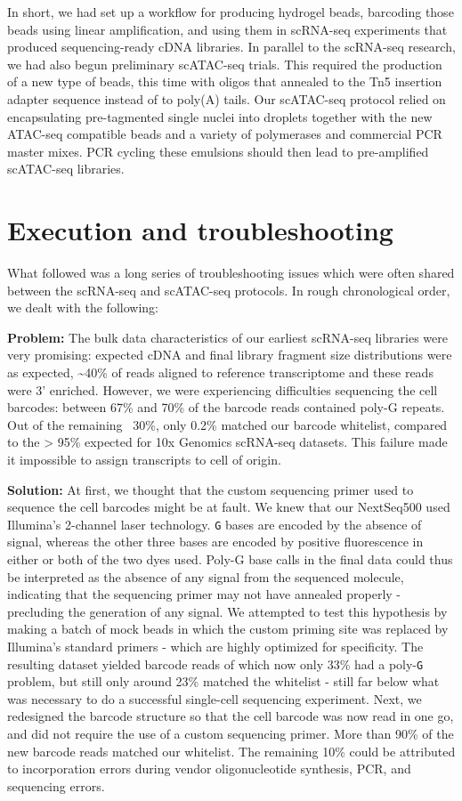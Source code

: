In short, we had set up a workflow for producing hydrogel beads, barcoding those beads using linear amplification, and using them in scRNA-seq experiments that produced sequencing-ready cDNA libraries. In parallel to the scRNA-seq research, we had also begun preliminary scATAC-seq trials. This required the production of a new type of beads, this time with oligos that annealed to the Tn5 insertion adapter sequence instead of to poly(A) tails. Our scATAC-seq protocol relied on encapsulating pre-tagmented single nuclei into droplets together with the new ATAC-seq compatible beads and a variety of polymerases and commercial PCR master mixes. PCR cycling these emulsions should then lead to pre-amplified scATAC-seq libraries.

\section{Execution and troubleshooting}
What followed was a long series of troubleshooting issues which were often shared between the scRNA-seq and scATAC-seq protocols. In rough chronological order, we dealt with the following:

\textbf{Problem:} The bulk data characteristics of our earliest scRNA-seq libraries were very promising: expected cDNA and final library fragment size distributions were as expected, \textasciitilde{40}\% of reads aligned to reference transcriptome and these reads were 3' enriched. However, we were experiencing difficulties sequencing the cell barcodes: between 67\% and 70\% of the barcode reads contained poly-G repeats. Out of the remaining ~30\%, only 0.2\% matched our barcode whitelist, compared to the > 95\% expected for 10x Genomics scRNA-seq datasets. This failure made it impossible to assign transcripts to cell of origin.

\textbf{Solution:} At first, we thought that the custom sequencing primer used to sequence the cell barcodes might be at fault. We knew that our NextSeq500 used Illumina's 2-channel laser technology. \verb|G| bases are encoded by the absence of signal, whereas the other three bases are encoded by positive fluorescence in either or both of the two dyes used. Poly-G base calls in the final data could thus be interpreted as the absence of any signal from the sequenced molecule, indicating that the sequencing primer may not have annealed properly - precluding the generation of any signal. We attempted to test this hypothesis by making a batch of mock beads in which the custom priming site was replaced by Illumina's standard primers - which are highly optimized for specificity. The resulting dataset yielded barcode reads of which now only 33\% had a poly-\verb|G| problem, but still only around 23\% matched the whitelist - still far below what was necessary to do a successful single-cell sequencing experiment. Next, we redesigned the barcode structure so that the cell barcode was now read in one go, and did not require the use of a custom sequencing primer. More than 90\% of the new barcode reads matched our whitelist. The remaining 10\% could be attributed to incorporation errors during vendor oligonucleotide synthesis, PCR, and sequencing errors.

